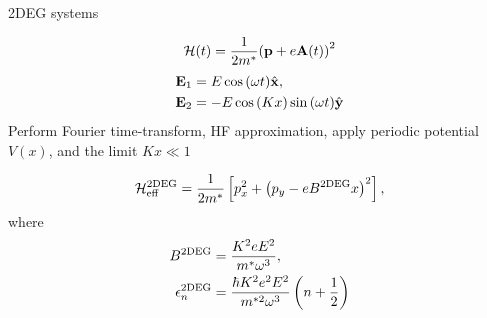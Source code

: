 \documentclass[xcolor=dvipsnames,10pt,aspectratio=169]{beamer}
\let\oldhat\hat
\renewcommand{\hat}[1]{\oldhat{\mathbf{#1}}}
\renewcommand{\vec}[1]{\mathbf{#1}}
\newcommand{\ham}{\mathcal{H}}
\begin{document}
  \begin{frame}{2DEG systems}

    \begin{equation}
      \small
      \ham (t) = \dfrac{1}{2m^*} {\left( \vec{p} +e \vec{A}(t)\right)}^2
    \end{equation}
    \begin{align}
      \small
      \vec{E}_1 &= E\cos{(\omega t)} \hat{x},\nonumber \\
      \vec{E}_2 &= -E\cos{(Kx)}\sin{(\omega t)} \hat{y}
    \end{align}
    Perform Fourier time-transform, HF approximation, apply periodic potential $V(x)$, and the limit $Kx\ll1$

    \begin{equation}
      \small
      \ham_{\text{eff}}^{\text{2DEG}} = \frac{1}{2m^*} \left[ p_x^2 + {\left(p_y - eB^{\text{2DEG}}x \right)}^2\right],
    \end{equation}
    where
    \begin{align}
      \small
      B^{\text{2DEG}} &= \frac{K^2 e E^2}{m^* \omega^3}, \\
      \epsilon_n^{\text{2DEG}} &= \dfrac{\hbar K^2 e^2 E^2}{m^{*2} \omega^3} \left( n+ \dfrac{1}{2}\right)
    \end{align}

  \end{frame}
\end{document}

